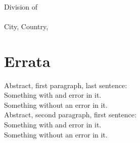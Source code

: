 \documentclass[10pt,a4paper,onecolumn,english]{book}
\begin{document}
\frontmatter

\begin{center} \LARGE \mytitle\\
\vspace{5mm}
\textsc{\large\authorname} \\
\vspace{5mm}
\end{center}

\pagestyle{empty}

\noindent
\mydepartment\\
Division of \division \\
\chalandgu\\
City, Country, \currentyear\\

\section*{Errata}

\vspace{3cm}

\newcommand{\errata}[3]{
\noindent
#1:\\
\hspace*{16pt}#2\\
\hspace*{16pt}\textrightarrow\quad #3
\\[2mm]
}

\errata{Abstract, first paragraph, last sentence}{Something with and error in it.}{Something without an error in it.}
\errata{Abstract, second paragraph, first sentence}{Something with and error in it.}{Something without an error in it.}
\end{document}

